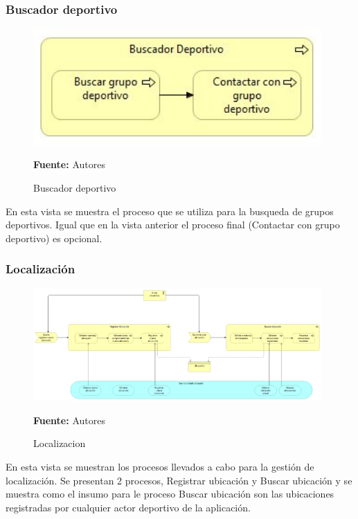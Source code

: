 \subsubsection{Buscador deportivo}

\begin{figure}[!htb]
  \begin{center}
    \includegraphics[width=11cm]{./imagenes/Archimate/vistas/business_process/buscadordeportivo.png}
    \caption{Buscador deportivo}
    \label{fig:BP_BuscadorDeportivo}
    \textbf{Fuente:}  Autores
  \end{center}
\end{figure}

En esta vista se muestra el proceso que se utiliza para la busqueda de grupos deportivos. Igual que en la vista anterior el proceso final (Contactar con grupo deportivo) es opcional.

\subsubsection{Localización}

\begin{figure}[!htb]
  \begin{center}
    \includegraphics[width=11cm]{./imagenes/Archimate/vistas/business_process/localizacion.png}
    \caption{Localizacion}
    \label{fig:BP_localizacion}
    \textbf{Fuente:}  Autores
  \end{center}
\end{figure}

En esta vista se muestran los procesos llevados a cabo para la gestión de localización. Se presentan 2 procesos, Registrar ubicación y Buscar ubicación y se muestra como el insumo para le proceso Buscar ubicación son las ubicaciones registradas por cualquier actor deportivo de la aplicación.

